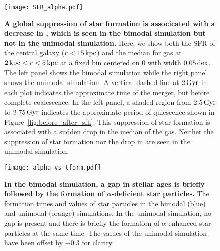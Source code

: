 \begin{figure*}
  \centering
  \texttt{[image: SFR\_alpha.pdf]}
  \caption{\textbf{A global suppression of star formation is associcated with a decrease in \MgFe{}, which is seen in the bimodal simulation but not in the unimodal simulation.} Here, we show both the SFR of the central galaxy ($r<15\,\textrm{kpc}$) and the median \MgFe{} for gas at $2\,\textrm{kpc}<r<5\,\textrm{kpc}$ at a fixed \FeH{} bin centered on $0$ with width $0.05\,\textrm{dex}$. The left panel shows the bimodal simulation while the right panel shows the unimodal simulation. A vertical dashed line at $2\,\textrm{Gyr}$ in each plot indicates the approximate time of the merger, but before complete coalescence. In the left panel, a shaded region from $2.5\,\textrm{Gyr}$ to $2.75\,\textrm{Gyr}$ indicates the approximate period of quiescence shown in Figure~\ref{fig:before_after_sfh}. This suppression of star formation is associated with a sudden drop in the median \MgFe{} of the gas. Neither the suppression of star formation nor the drop in \MgFe{} are seen in the unimodal simulation.}
  \label{fig:SFR_alpha}
\end{figure*}

\begin{figure}
  \centering
  \texttt{[image: alpha\_vs\_tform.pdf]}
  \caption{\textbf{In the bimodal simulation, a gap in stellar ages is briefly followed by the formation of $\alpha$-deficient star particles.} The formation times and \MgFe{} values of star particles in the bimodal (blue) and unimodal (orange) simulations. In the unimodal simulation, no gap is present and there is briefly the formation of $\alpha$-enhanced star particles at the same time. The \MgFe{} values of the unimodal simulation have been offset by $-0.3$ for clarity.}
  \label{fig:alpha_vs_tform}
\end{figure}
